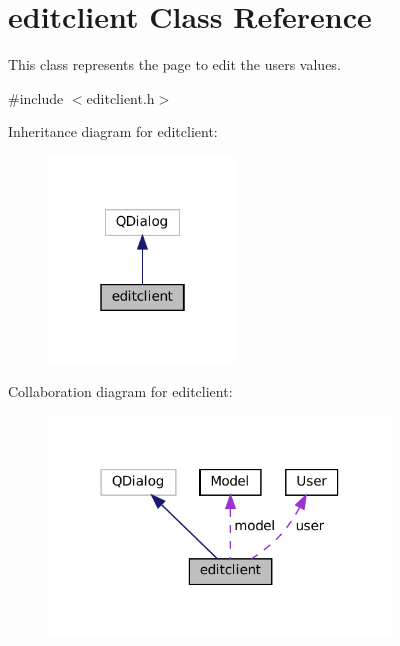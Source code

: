 \hypertarget{classeditclient}{}\section{editclient Class Reference}
\label{classeditclient}


This class represents the page to edit the user\textquotesingle{}s values.  




{\ttfamily \#include $<$editclient.\+h$>$}



Inheritance diagram for editclient\+:
\nopagebreak
\begin{figure}[H]
\begin{center}
\leavevmode
\includegraphics[width=142pt]{classeditclient__inherit__graph}
\end{center}
\end{figure}


Collaboration diagram for editclient\+:
\nopagebreak
\begin{figure}[H]
\begin{center}
\leavevmode
\includegraphics[width=258pt]{classeditclient__coll__graph}
\end{center}
\end{figure}

